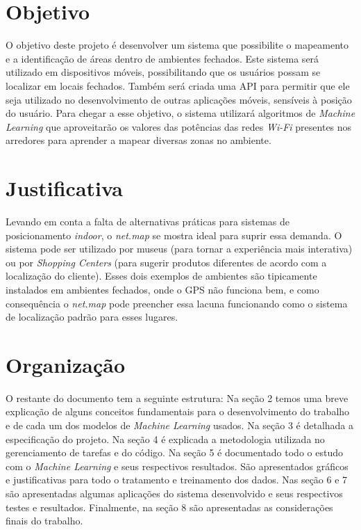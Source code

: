 \section{Objetivo}\label{sec:objetctive}
O objetivo deste projeto é desenvolver um sistema que possibilite
o mapeamento e a identificação de áreas dentro de ambientes fechados. Este
sistema será utilizado em dispositivos móveis, possibilitando que os
usuários possam se localizar em locais fechados. Também será criada uma API para permitir que ele seja utilizado no desenvolvimento de outras aplicações móveis, sensíveis à posição do usuário. Para chegar a esse objetivo, o sistema utilizará algoritmos de \textit{Machine Learning} que aproveitarão os valores das potências das redes \textit{Wi-Fi} presentes nos arredores para aprender a mapear diversas zonas no ambiente.

\section{Justificativa}\label{sec:justify}
Levando em conta a falta de alternativas práticas para sistemas de posicionamento \textit{indoor}, o \textit{net.map} se mostra ideal para suprir essa demanda. O sistema pode ser utilizado por museus (para tornar a experiência mais interativa) ou por \textit{Shopping Centers}  (para sugerir produtos diferentes de acordo com a localização do cliente). Esses dois exemplos de ambientes são tipicamente instalados em ambientes fechados, onde o GPS não funciona bem, e como consequência o \textit{net.map} pode preencher essa lacuna funcionando como o sistema de localização padrão para esses lugares.

\section{Organização}\label{sec:organization}

O restante do documento tem a seguinte estrutura: Na seção 2 temos uma breve explicação de alguns conceitos fundamentais para o desenvolvimento do trabalho e de cada um dos modelos de \textit{Machine Learning} usados. Na seção 3 é detalhada a especificação do projeto. Na seção 4 é explicada a metodologia utilizada no gerenciamento de tarefas e do código. Na seção 5 é documentado todo o estudo com o \textit {Machine Learning} e seus respectivos resultados. São apresentados gráficos e justificativas para todo o tratamento e treinamento dos dados. Nas seção 6 e 7 são apresentadas algumas aplicações do sistema desenvolvido e seus respectivos testes e resultados. Finalmente, na seção 8 são apresentadas as considerações finais do trabalho.
